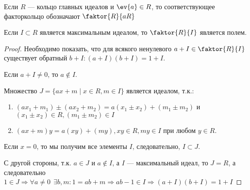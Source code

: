 Если \(R\) --- кольцо главных идеалов и \(\ev{a} \in R\),
то соответствующее факторкольцо обозначают \(\faktor{R}{aR}\)

\begin{theorem}
    Если \(I \subset R\) является максимальным идеалом,
    то \(\faktor{R}{I}\) является полем.
\end{theorem}
\begin{proof}
    Необходимо показать, что для всякого ненулевого \(a + I \in \faktor{R}{I}\)
    существует обратный \(b + I : (a + I)(b + I) = 1 + I\).
    
    Если \(a + I \neq 0\), то \(a \notin I\).
    
    Множество \(J = \{ax + m \mid x \in R, m \in I\}\) является идеалом,
    т.к.:
    \begin{enumerate}
        \item \((ax_1 + m_1) \pm (ax_2 + m_2) = a(x_1 \pm x_2) + (m_1 \pm m_2)
        \) и \((x_1 \pm x_2) \in R, (m_1 \pm m_2) \in I\)
        \item \((ax + m)y = a(xy) + (my), xy \in R, my \in I\) при любом \(y \in R\). 
    \end{enumerate}
    
    Если \(x = 0\), то мы получим все элементы \(I\),
    следовательно, \(I \subset J\).
    
    С другой стороны, т.к. \(a \in J\) и \(a \notin I\), а \(I\) --- максимальный идеал,
    то \(J = R\), а следовательно \(1 \in J \Rightarrow \forall a \neq 0
    \ \ \exists b, m : 1 = ab + m \Rightarrow ab - 1 \in I \Rightarrow (a + I)(b + I) = 1 + I\)
\end{proof}


